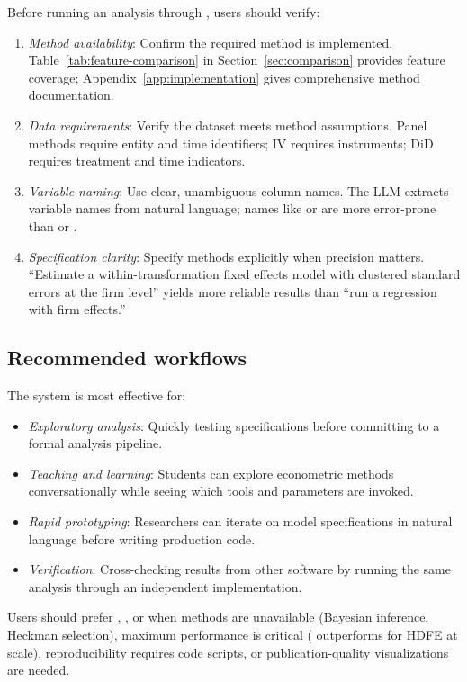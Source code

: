 Before running an analysis through , users should verify:
\begin{enumerate}
  \item \emph{Method availability}: Confirm the required method is implemented.
    Table~\ref{tab:feature-comparison} in Section~\ref{sec:comparison} provides
    feature coverage; Appendix~\ref{app:implementation} gives comprehensive
    method documentation.
  \item \emph{Data requirements}: Verify the dataset meets method assumptions.
    Panel methods require entity and time identifiers; IV requires instruments;
    DiD requires treatment and time indicators.
  \item \emph{Variable naming}: Use clear, unambiguous column names. The LLM
    extracts variable names from natural language; names like  or
     are more error-prone than  or .
  \item \emph{Specification clarity}: Specify methods explicitly when
    precision matters. ``Estimate a within-transformation fixed effects model
    with clustered standard errors at the firm level'' yields more reliable
    results than ``run a regression with firm effects.''
\end{enumerate}

\subsection{Recommended workflows}

The system is most effective for:
\begin{itemize}
  \item \emph{Exploratory analysis}: Quickly testing specifications before
    committing to a formal analysis pipeline.
  \item \emph{Teaching and learning}: Students can explore econometric methods
    conversationally while seeing which tools and parameters are invoked.
  \item \emph{Rapid prototyping}: Researchers can iterate on model specifications
    in natural language before writing production code.
  \item \emph{Verification}: Cross-checking results from other software by
    running the same analysis through an independent implementation.
\end{itemize}

\noindent Users should prefer , , or 
when methods are unavailable (Bayesian inference, Heckman selection), maximum
performance is critical ( outperforms for HDFE at scale),
reproducibility requires code scripts, or publication-quality visualizations
are needed.

